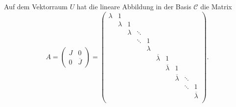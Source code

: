 Auf dem Vektorraum $U$ hat die lineare Abbildung in der Basis
$\mathcal{C}$ die Matrix
\[
A=
\begin{pmatrix}
J&0\\
0&\overline{J}
\end{pmatrix}
=
\begin{pmatrix}
\lambda&   1   &       &      &       &&&&&\\
       &\lambda&   1   &      &       &&&&&\\
       &       &\lambda&\ddots&       &&&&&\\
       &       &       &\ddots&   1   &&&&&\\
       &       &       &      &\lambda&&&&&\\
&&&& &\overline{\lambda}&1&&     & \\
&&&& &&\overline{\lambda}&1&     & \\
&&&& &&&\overline{\lambda} &\ddots& \\
&&&& &&&                   &\ddots&1\\
&&&& &&&                   &&\overline{\lambda}\\
\end{pmatrix}.
\]

